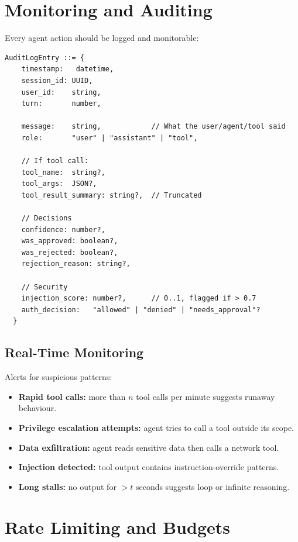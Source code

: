\section{Monitoring and Auditing}

Every agent action should be logged and monitorable:

\begin{lstlisting}[caption=Agent audit log schema]
  AuditLogEntry ::= {
    timestamp:   datetime,
    session_id: UUID,
    user_id:    string,
    turn:       number,

    message:    string,            // What the user/agent/tool said
    role:       "user" | "assistant" | "tool",

    // If tool call:
    tool_name:  string?,
    tool_args:  JSON?,
    tool_result_summary: string?,  // Truncated

    // Decisions
    confidence: number?,
    was_approved: boolean?,
    was_rejected: boolean?,
    rejection_reason: string?,

    // Security
    injection_score: number?,      // 0..1, flagged if > 0.7
    auth_decision:   "allowed" | "denied" | "needs_approval"?
  }
\end{lstlisting}

\subsection{Real-Time Monitoring}

Alerts for suspicious patterns:

\begin{itemize}
	\item \textbf{Rapid tool calls:} more than $n$ tool calls per minute suggests runaway behaviour.
	\item \textbf{Privilege escalation attempts:} agent tries to call a tool outside its scope.
	\item \textbf{Data exfiltration:} agent reads sensitive data then calls a network tool.
	\item \textbf{Injection detected:} tool output contains instruction-override patterns.
	\item \textbf{Long stalls:} no output for $> t$ seconds suggests loop or infinite reasoning.
\end{itemize}

\section{Rate Limiting and Budgets}

